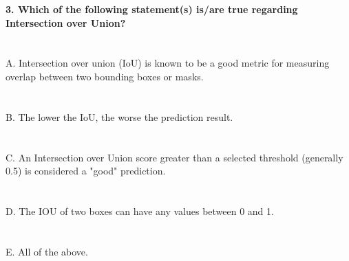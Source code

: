\documentclass[prl,twocolumn,showpacs,preprintnumbers,superscriptaddress]{revtex4}
\theoremstyle{plain}
\theoremstyle{definition}
\begin{document}
\begin{widetext}
\textbf{3. Which of the following statement(s) is/are true regarding Intersection over Union?}
\\
\\
\\
A. Intersection over union (IoU) is known to be a good metric for measuring overlap between two bounding boxes or masks.
\\
\\
\\
B. The lower the IoU, the worse the prediction result.
\\
\\
\\
C. An Intersection over Union score greater than a selected threshold (generally 0.5) is considered a "good" prediction. 
\\
\\
\\
D. The IOU of two boxes can have any values between 0 and 1.
\\
\\
\\
E. All of the above.
\\
\\
\\

\end{widetext}
\end{document}
